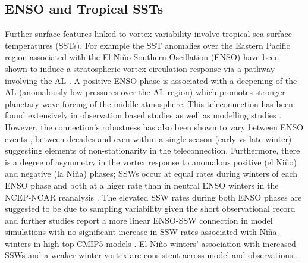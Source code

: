 \subsection{ENSO and Tropical SSTs}
\label{sec:external_influence_SSTs}
Further surface features linked to vortex variability involve tropical sea surface temperatures (SSTs). For example the SST anomalies over the Eastern Pacific region associated with the El Ni\~{n}o Southern Oscillation (ENSO) have been shown to induce a stratospheric vortex circulation response via a pathway involving the AL \citep{domeisenTeleconnection2019d}. A positive ENSO phase is associated with a deepening of the AL (anomalously low pressures over the AL region) which promotes stronger planetary wave forcing of the middle atmosphere. This teleconnection has been found extensively in observation based studies \citep{garfinkelDifferent2008b, inesonRole2009b, smithLinear2012b} as well as modelling studies \citep{bellStratospheric2009b, domeisenSeasonal2015b, manziniInfluence2006b, richterEffects2015b}. However, the connection's robustness has also been shown to vary between ENSO events \citep{deserNorthern2017b, izaStratospheric2016b}, between decades \citep{ayarzaguena2018} and even within a single season (early vs late winter) \citep{ayarzaguenaIntraseasonal2018d} suggesting elements of non-stationarity in the teleconnection. Furthermore, there is a degree of asymmetry in the vortex response to anomalous positive (el Ni\~{n}o) and negative (la Ni\~{n}a) phases; SSWs occur at equal rates during winters of each ENSO phase and both at a higer rate than in neutral ENSO winters in the NCEP-NCAR reanalysis \citep{butlerNino2011b, garfinkelWhy2012b}. The elevated SSW rates during both ENSO phases are suggested to be due to sampling variability given the short observational record and further studies report a more linear ENSO-SSW connection in model simulations \citep{polvaniDistinguishing2017b} with no significant increase in SSW rates associated with Ni\~{n}a winters in high-top CMIP5 models \citep{songRevisiting2018b}. El Ni\~{n}o winters' association with increased SSWs and a weaker winter vortex are consistent across model and observations \citep{manziniInfluence2006b, richterEffects2015b}. 

